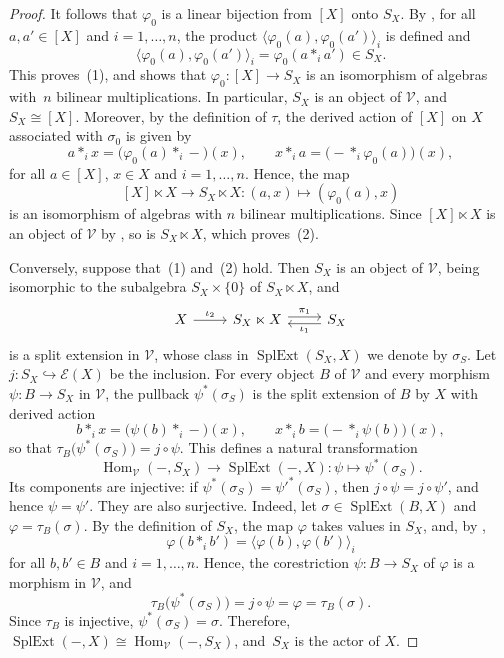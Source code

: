 \documentclass[reqno,a4paper]{amsart}
\theoremstyle{plain}
\theoremstyle{definition}
\theoremstyle{remark}
\numberwithin{equation}{section}
\newcommand{\E}{\mathcal{E}}
\newcommand{\V}{\mathcal{V}}
\DeclareMathOperator{\Hom}{Hom}
\DeclareMathOperator{\SplExt}{SplExt}
\begin{document}
\begin{proof}
It follows that $\varphi_0$ is a linear bijection from $[X]$ onto $S_X$. By , for all $a,a'\in[X]$ and $i=1,\ldots,n$, the product $\langle\varphi_0(a),\varphi_0(a')\rangle_i$ is defined and
\[
\bigl\langle\varphi_0(a),\varphi_0(a')\bigr\rangle_i=\varphi_0(a\ast_ia')\in S_X.
\]
This proves~(1), and shows that $\varphi_0\colon[X]\to S_X$ is an isomorphism of algebras with~$n$ bilinear multiplications. In particular, $S_X$ is an object of $\V$, and $S_X\cong[X]$. Moreover, by the definition of $\tau$, the derived action of $[X]$ on $X$ associated with $\sigma_0$ is given by
\[
a\ast_ix=\bigl(\varphi_0(a)\ast_i-\bigr)(x),
\qquad
x\ast_ia=\bigl(-\ast_i\varphi_0(a)\bigr)(x),
\]
for all $a\in[X]$, $x\in X$ and $i=1,\ldots,n$. Hence, the map
\[
[X]\ltimes X\to S_X\ltimes X\colon(a,x)\mapsto(\varphi_0(a),x)
\]
is an isomorphism of algebras with $n$ bilinear multiplications. Since $[X]\ltimes X$ is an object of $\V$ by , so is $S_X\ltimes X$, which proves~(2).

Conversely, suppose that~(1) and~(2) hold. Then $S_X$ is an object of $\V$, being isomorphic to the subalgebra $S_X \times \{0\}$ of $S_X\ltimes X$, and
\[
\begin{tikzcd}
X \arrow[r, "\iota_2"]
&
S_X\ltimes X \arrow[r, shift left, "\pi_1"]
&
S_X \arrow[l, shift left, "\iota_1"]
\end{tikzcd}
\]
is a split extension in $\V$, whose class in $\SplExt(S_X,X)$ we denote by $\sigma_S$. Let $j\colon S_X\hookrightarrow\E(X)$ be the inclusion. For every object $B$ of $\V$ and every morphism $\psi\colon B\to S_X$ in $\V$, the pullback $\psi^*(\sigma_S)$ is the split extension of $B$ by $X$ with derived action
\[
b\ast_ix=\bigl(\psi(b)\ast_i-\bigr)(x),
\qquad
x\ast_ib=\bigl(-\ast_i\psi(b)\bigr)(x),
\]
so that $\tau_B\bigl(\psi^*(\sigma_S)\bigr)=j\circ\psi$. This defines a natural transformation
\[
\Hom_{\V}(-,S_X)\to\SplExt(-,X)\colon\psi\mapsto\psi^*(\sigma_S).
\]
Its components are injective: if $\psi^*(\sigma_S)=\psi'^*(\sigma_S)$, then $j\circ\psi=j\circ\psi'$, and hence $\psi=\psi'$. They are also surjective. Indeed, let $\sigma\in\SplExt(B,X)$ and $\varphi=\tau_B(\sigma)$. By the definition of $S_X$, the map $\varphi$ takes values in $S_X$, and, by ,
\[
\varphi(b\ast_ib')=\bigl\langle\varphi(b),\varphi(b')\bigr\rangle_i
\]
for all $b,b'\in B$ and $i=1,\ldots,n$. Hence, the corestriction $\psi\colon B\to S_X$ of $\varphi$ is a morphism in $\V$, and
\[
\tau_B\bigl(\psi^*(\sigma_S)\bigr)=j\circ\psi=\varphi=\tau_B(\sigma).
\]
Since $\tau_B$ is injective, $\psi^*(\sigma_S)=\sigma$. Therefore, $\SplExt(-,X)\cong\Hom_\V(-,S_X)$, and~$S_X$ is the actor of $X$.
\end{proof}
\end{document}
